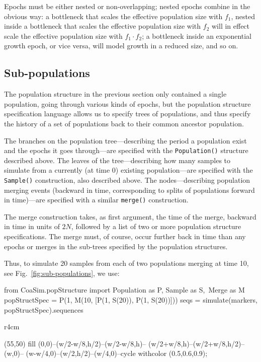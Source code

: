 \documentclass{manual}
\begin{document}
\begin{empfile}
Epochs must be either nested or non-overlapping; nested epochs combine
in the obvious way: a bottleneck that scales the effective population
size with $f_1$, nested inside a bottleneck that scales the effective
population size with $f_2$ will in effect scale the effective
population size with $f_1\cdot{}f_2$; a bottleneck inside an
exponential growth epoch, or vice versa, will model growth in a
reduced size, and so on.



\subsection{Sub-populations}
\label{sec:sub-pop}

The population structure in the previous section only contained a
single population, going through various kinds of epochs, but the
population structure specification language allows us to specify trees
of populations, and thus specify the history of a set of populations
back to their common ancestor population.

The branches on the population tree---describing the period a
population exist and the epochs it goes through---are specified with
the \texttt{Population()} structure described above.  The leaves of
the tree---describing how many samples to simulate from a currently
(at time 0) existing population---are specified with the
\texttt{Sample()} construction, also described above.  The
nodes---describing population merging events (backward in time,
corresponding to splits of populations forward in time)---are
specified with a similar \texttt{merge()} construction.

The merge construction takes, as first argument, the time of the
merge, backward in time in units of $2N$, followed by a list of two or
more population structure specifications.  The merge must, of course,
occur further back in time than any epochs or merges in the sub-trees
specified by the population structures.

Thus, to simulate 20 samples from each of two populations merging at
time 10, see Fig.~\ref{fig:sub-populations}, we use:
\begin{code}
from CoaSim.popStructure import Population as P, Sample as S,\
                                Merge as M
popStructSpec = P(1, M(10, [P(1, S(20)), P(1, S(20))]))
seqs = simulate(markers, popStructSpec).sequences
\end{code}

\begin{wrapfigure}{r}{4cm}
  \vspace*{-.5\baselineskip}
  \centering
  \begin{emp}(55,50)
    fill (0,0)--(w/2-w/8,h/2)--(w/2-w/8,h)--
         (w/2+w/8,h)--(w/2+w/8,h/2)--(w,0)--
         (w-w/4,0)--(w/2,h/2)--(w/4,0)--cycle
         withcolor (0.5,0.6,0.9); %


\end{emp}
\end{wrapfigure}
\end{empfile}
\end{document}
